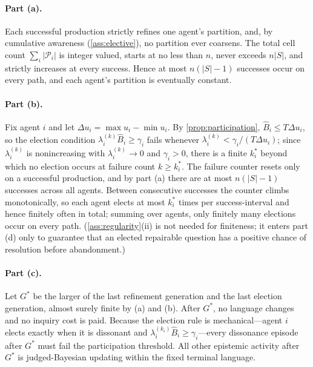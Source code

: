 \documentclass[11pt]{article}
\theoremstyle{definition}
\begin{document}
\paragraph{Part (a).}
Each successful production strictly refines one agent's partition, and, by
cumulative awareness (\cref{ass:elective}), no partition ever coarsens.  The
total cell count $\sum_i\lvert\mathcal P_i\rvert$ is integer valued, starts
at no less than $n$, never exceeds $n\lvert S\rvert$, and strictly increases
at every success.  Hence at most $n(\lvert S\rvert-1)$ successes occur on
every path, and each agent's partition is eventually constant.

\paragraph{Part (b).}
Fix agent $i$ and let $\Delta u_i=\max u_i-\min u_i$.  By
\cref{prop:participation}, $\widehat B_i\leq T\Delta u_i$, so the election
condition $\lambda_i^{(k)}\widehat B_i\geq\gamma_i$ fails whenever
$\lambda_i^{(k)}<\gamma_i/(T\Delta u_i)$; since $\lambda_i^{(k)}$ is
nonincreasing with $\lambda_i^{(k)}\to0$ and $\gamma_i>0$, there is a finite
$k_i^{*}$ beyond which no election occurs at failure count $k\geq k_i^{*}$.
The failure counter resets only on a successful production, and by part (a)
there are at most $n(\lvert S\rvert-1)$ successes across all agents.  Between
consecutive successes the counter climbs monotonically, so each agent elects
at most $k_i^{*}$ times per success-interval and hence finitely often in
total; summing over agents, only finitely many elections occur on every path.
(\cref{ass:regularity}(ii) is not needed for finiteness; it enters part (d)
only to guarantee that an elected repairable question has a positive chance of
resolution before abandonment.)

\paragraph{Part (c).}
Let $G^{*}$ be the larger of the last refinement generation and the last
election generation, almost surely finite by (a) and (b).  After $G^{*}$, no
language changes and no inquiry cost is paid.  Because the election rule is
mechanical---agent $i$ elects exactly when it is dissonant and
$\lambda_i^{(k_i)}\widehat B_i\geq\gamma_i$---every dissonance episode after
$G^{*}$ must fail the participation threshold.  All other epistemic activity
after $G^{*}$ is judged-Bayesian updating within the fixed terminal language.
\end{document}

